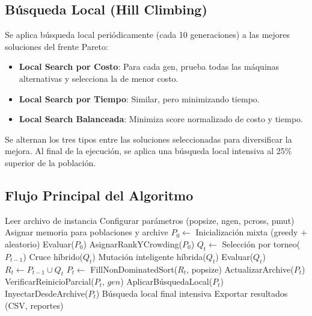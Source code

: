 \documentclass[preprint,12pt,authoryear]{elsarticle}
\begin{document}
\subsection{Búsqueda Local (Hill Climbing)}

Se aplica búsqueda local periódicamente (cada 10 generaciones) a las mejores soluciones del frente Pareto:

\begin{itemize}
    \item \textbf{Local Search por Costo}: Para cada gen, prueba todas las máquinas alternativas y selecciona la de menor costo.
    \item \textbf{Local Search por Tiempo}: Similar, pero minimizando tiempo.
    \item \textbf{Local Search Balanceada}: Minimiza score normalizado de costo y tiempo.
\end{itemize}

Se alternan los tres tipos entre las soluciones seleccionadas para diversificar la mejora. Al final de la ejecución, se aplica una búsqueda local intensiva al 25\% superior de la población.

\subsection{Flujo Principal del Algoritmo}

\begin{algorithm}[h]
\caption{NSGA-II Mejorado - Flujo Principal}
\begin{algorithmic}[1]
\STATE Leer archivo de instancia
\STATE Configurar parámetros (popsize, ngen, pcross, pmut)
\STATE Asignar memoria para poblaciones y archive
\STATE $P_0 \leftarrow$ Inicialización mixta (greedy + aleatorio)
\STATE Evaluar($P_0$)
\STATE AsignarRankYCrowding($P_0$)
    \STATE $Q_t \leftarrow$ Selección por torneo($P_{t-1}$)
    \STATE Cruce híbrido($Q_t$)
    \STATE Mutación inteligente híbrida($Q_t$)
    \STATE Evaluar($Q_t$)
    \STATE $R_t \leftarrow P_{t-1} \cup Q_t$
    \STATE $P_t \leftarrow$ FillNonDominatedSort($R_t$, popsize)
    \STATE ActualizarArchive($P_t$)
    \STATE VerificarReinicioParcial($P_t$, $gen$)
        \STATE AplicarBúsquedaLocal($P_t$)
    \ENDIF
        \STATE InyectarDesdeArchive($P_t$)
    \ENDIF
\ENDFOR
\STATE Búsqueda local final intensiva
\STATE Exportar resultados (CSV, reportes)
\end{algorithmic}
\end{algorithm}
\end{document}
